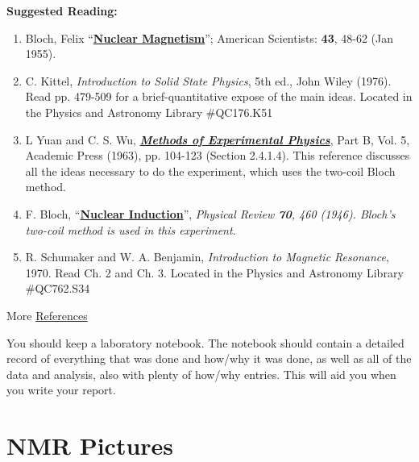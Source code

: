 \documentclass{../lab}
\begin{document}
\textbf{Suggested Reading:}

\begin{enumerate}
    \item Bloch, Felix ``\href{http://physics111.lib.berkeley.edu/Physics111/Reprints/NMR/02-Nuclear\_Magnetism.pdf}{\textbf{Nuclear Magnetism}}''; American Scientists: \textbf{43}, 48-62 (Jan 1955).

    \item C. Kittel, \emph{Introduction to Solid State Physics}, 5th ed., John Wiley (1976). Read pp. 479-509 for a brief-quantitative expose of the main ideas. Located in the Physics and Astronomy Library \#QC176.K51

    \item L Yuan and C. S. Wu, \emph{\href{http://physics111.lib.berkeley.edu/Physics111/Reprints/NMR/01-Methods\_of\_Experimental\_Physics.pdf}{\textbf{Methods of Experimental Physics}}}, Part B, Vol. 5, Academic Press (1963), pp. 104-123 (Section 2.4.1.4). This reference discusses all the ideas necessary to do the experiment, which uses the two-coil Bloch method.

    \item F. Bloch, ``\href{http://physics111.lib.berkeley.edu/Physics111/Reprints/NMR/03-Nuclear_Induction.pdf}{\textbf{Nuclear Induction}}'', \emph{Physical Review \textbf{70}, 460 (1946). Bloch's two-coil method is used in this experiment. }

    \item R. Schumaker and W. A. Benjamin, \emph{Introduction to Magnetic Resonance}, 1970. Read Ch. 2 and Ch. 3. Located in the Physics and Astronomy Library \#QC762.S34
\end{enumerate}

More \hyperref[References]{References}

You should keep a laboratory notebook. The notebook should contain a detailed record of everything that was done and how/why it was done, as well as all of the data and analysis, also with plenty of how/why entries. This will aid you when you write your report.

\section{NMR Pictures}
\end{document}
